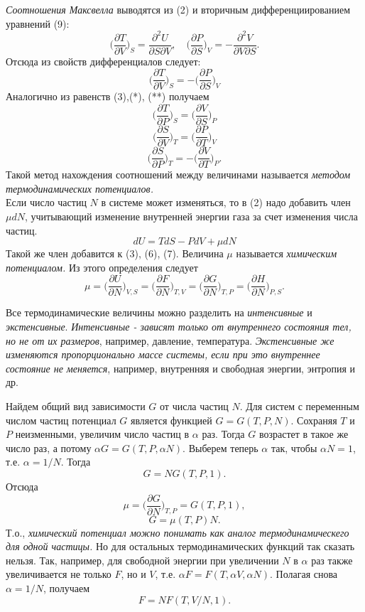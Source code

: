 \documentclass[14pt,a4paper]{scrartcl}
\begin{document}
	\textit{Соотношения Максвелла} выводятся из (2) и вторичным дифференциированием уравнений (9):
	$$\biggl(\dfrac{\partial T}{\partial V}\biggr)_S = \dfrac{\partial^2 U}{\partial S\partial V}, \quad \biggl(\dfrac{\partial P}{\partial S}\biggr)_V = -\dfrac{\partial^2 V}{\partial V\partial S}.$$
	Отсюда из свойств дифференциалов следует:
	$$\biggl(\dfrac{\partial T}{\partial V}\biggr)_S = -\biggl(\dfrac{\partial P}{\partial S}\biggr)_V $$
	Аналогично из равенств (3),(*), (**) получаем
	$$\biggl(\dfrac{\partial T}{\partial P}\biggr)_S = \biggl(\dfrac{\partial V}{\partial S}\biggr)_P $$
	$$\biggl(\dfrac{\partial S}{\partial V}\biggr)_T = \biggl(\dfrac{\partial P}{\partial T}\biggr)_V $$
	$$\biggl(\dfrac{\partial S}{\partial P}\biggr)_T = -\biggl(\dfrac{\partial V}{\partial T}\biggr)_P. $$
	Такой метод нахождения соотношений между величинами называется \textit{методом термодинамических потенциалов.}\\
	
	\quad Если число частиц $N$ в системе может изменяться, то в (2)  надо добавить член $\mu dN$, учитывающий изменение внутренней энергии газа за счет изменения числа частиц. 
	$$dU = TdS - PdV +\mu dN$$
	Такой же член добавится к (3), (6), (7). Величина $\mu$ называется \textit{химическим потенциалом.} Из этого определения следует
	$$\mu = \biggl(\dfrac{\partial U}{\partial N}\biggr)_{V,S} = \biggl(\dfrac{\partial F}{\partial N}\biggr)_{T,V} = \biggl(\dfrac{\partial G}{\partial N}\biggr)_{T,P} = \biggl(\dfrac{\partial H}{\partial N}\biggr)_{P,S}.$$
	
	\quad Все термодинамические величины можно разделить на \textit{интенсивные} и \textit{экстенсивные}. \textit{Интенсивные - зависят только от внутреннего состояния тел, но не от их размеров}, например, давление, температура. \textit{Экстенсивные же изменяются пропорционально массе системы, если при это внутреннее состояние не меняется}, например, внутренняя и свободная энергии, энтропия и др.
	
	\quad Найдем общий вид зависимости $G$ от числа частиц $N$. Для систем с переменным числом частиц потенциал $G$ является функцией $G= G(T,P,N)$. Сохраняя $T$ и $P$ неизменными, увеличим число частиц в $\alpha$ раз. Тогда $G$ возрастет в такое же число раз, а потому $\alpha G = G(T,P,\alpha N)$. Выберем теперь $\alpha$ так, чтобы $\alpha N = 1$, т.е. $\alpha = 1/N$. Тогда
	$$G = NG(T,P,1).$$
	Отсюда
	 $$\mu =\biggl(\dfrac{\partial G}{\partial N}\biggr)_{T,P} = G(T,P,1), $$
	 $$G = \mu(T,P)N.$$
	 Т.о., \textit{химический потенциал можно понимать как аналог термодинамическего для одной частицы. } Но для остальных термодинамических функций так сказать нельзя. Так, например, для свободной энергии при увеличении $N$ в $\alpha$ раз также увеличивается не только $F$, но и $V$, т.е. $\alpha F = F(T, \alpha V, \alpha N)$. Полагая снова $\alpha = 1/N$, получаем $$F = N F(T,V/N,1).$$\\
	 
\end{document}

